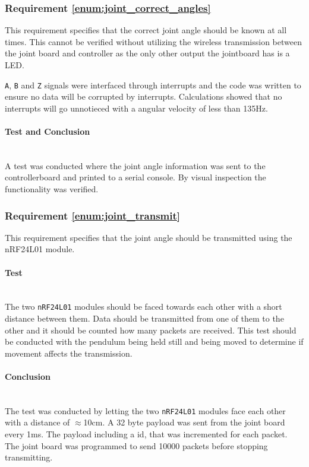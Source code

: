 {\subsubsection{Requirement \ref{enum:joint_correct_angles}} %
\label{ssub:requirement_enum:correct_angles}
This requirement specifies that the correct joint angle should be known at all times.
This cannot be verified without utilizing the wireless transmission between the joint board and controller as the only other output the jointboard has is a LED.

\texttt{A}, \texttt{B} and \texttt{Z} signals were interfaced through interrupts and the code was written to ensure no data will be corrupted by interrupts.
Calculations showed that no interrupts will go unnotieced with a angular velocity of less than 135Hz. 

\paragraph{Test and Conclusion}~\\
A test was conducted where the joint angle information was sent to the controllerboard and printed to a serial console. 
By visual inspection the functionality was verified.

\subsubsection{Requirement \ref{enum:joint_transmit}} %
\label{ssub:requirement_enum:joint_transmit}
This requirement specifies that the joint angle should be transmitted using the nRF24L01 module.

\paragraph{Test}~\\
The two \texttt{nRF24L01} modules should be faced towards each other with a short distance between them.
Data should be transmitted from one of them to the other and it should be counted how many packets are received.
This test should be conducted with the pendulum being held still and being moved to determine if movement affects the transmission.

\paragraph{Conclusion}~\\
The test was conducted by letting the two \texttt{nRF24L01} modules face each other with a distance of $\approx$10cm.
A 32 byte payload was sent from the joint board every 1ms. 
The payload including a id, that was incremented for each packet.
The joint board was programmed to send 10000 packets before stopping transmitting. 

}
